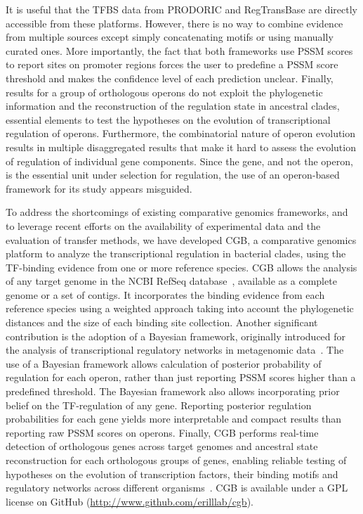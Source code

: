It is useful that the TFBS data from PRODORIC and RegTransBase are directly
accessible from these platforms. However, there is no way to combine evidence
from multiple sources except simply concatenating motifs or using manually
curated ones. More importantly, the fact that both frameworks use PSSM scores
to report sites on promoter regions forces the user to predefine a PSSM score
threshold and makes the confidence level of each prediction unclear. Finally,
results for a group of orthologous operons do not exploit the phylogenetic
information and the reconstruction of the regulation state in ancestral clades,
essential elements to test the hypotheses on the evolution of transcriptional
regulation of operons. Furthermore, the combinatorial nature of operon
evolution results in multiple disaggregated results that make it hard to assess
the evolution of regulation of individual gene components. Since the gene, and
not the operon, is the essential unit under selection for regulation, the use
of an operon-based framework for its study appears misguided.

To address the shortcomings of existing comparative genomics frameworks, and to
leverage recent efforts on the availability of experimental data and the
evaluation of transfer methods, we have developed CGB, a comparative genomics
platform to analyze the transcriptional regulation in bacterial clades, using
the TF-binding evidence from one or more reference species. CGB allows the
analysis of any target genome in the NCBI RefSeq
database~\citep{o2015reference}, available as a complete genome or a set of
contigs. It incorporates the binding evidence from each reference species using
a weighted approach taking into account the phylogenetic distances and the size
of each binding site collection. Another significant contribution is the
adoption of a Bayesian framework, originally introduced for the analysis of
transcriptional regulatory networks in metagenomic
data~\citep{hobbs2016bayesian}. The use of a Bayesian framework allows
calculation of posterior probability of regulation for each operon, rather than
just reporting PSSM scores higher than a predefined threshold. The Bayesian
framework also allows incorporating prior belief on the TF-regulation of any
gene. Reporting posterior regulation probabilities for each gene yields more
interpretable and compact results than reporting raw PSSM scores on operons. Finally,
CGB performs real-time detection of orthologous genes across target genomes and
ancestral state
reconstruction for each orthologous groups of genes, enabling reliable testing
of hypotheses on the evolution of transcription factors, their binding motifs
and regulatory networks across different
organisms~\citep{pagel1999inferring}. CGB is available under a GPL license
on GitHub (\url{http://www.github.com/erilllab/cgb}).

